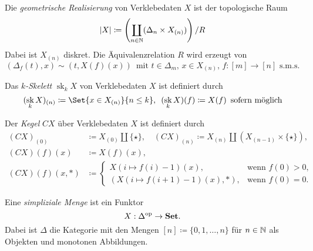 \documentclass{cheat-sheet}
\DeclareMathOperator{\sk}{sk} %
\begin{document}
\begin{defn}
  Die \emph{geometrische Realisierung} von Verklebedaten $X$ ist der topologische Raum
  \[ \lvert X\rvert \coloneqq \left( \coprod_{n \in \mathbb{N}} (\Delta_n \times X_{(n)}) \right) / R \]
  Dabei ist $X_{(n)}$ diskret. Die Äquivalenzrelation $R$ wird erzeugt von
  \[
    (\Delta_f(t), x) \sim (t, X(f)(x)) \enspace
    \text{mit $t \in \Delta_m$, $x \in X_{(n)}$, $f : [m] {\to} [n]$ s.m.s.}
  \]
\end{defn}


\begin{defn}
  Das \emph{$k$-Skelett} $\sk_k X$ von Verklebedaten $X$ ist definiert durch
  \[
    (\sk_k X)_{(n)} \coloneqq
    \Set{ x \in X_{(n)} }{ n \leq k }, \enspace
    (\sk_k X)(f) \coloneqq X(f) \enspace \text{sofern möglich}
  \]
\end{defn}

\begin{defn}
  Der \emph{Kegel} $CX$ über Verklebedaten $X$ ist definiert durch
  \begin{align*}
    (CX)_{(0)} & \coloneqq X_{(0)} \amalg \{ \star \}, \quad (CX)_{(n)} \coloneqq X_{(n)} \amalg (X_{(n-1)} \times \{ \star \}), \\
    (CX)(f)(x) & \coloneqq X(f)(x), \\
    (CX)(f)(x,*) &  \coloneqq \begin{cases}
      X(i \mapsto f(i) - 1)(x), & \text{wenn $f(0) > 0$,} \\
      (X(i \mapsto f(i{+}1) - 1)(x), *), & \text{wenn $f(0) = 0$.}
    \end{cases}
  \end{align*}
\end{defn}



\begin{defn}
  Eine \emph{simpliziale Menge} ist ein Funktor
  \[ X : \Delta^{\mathrm{op}} \to \mathbf{Set}. \]
  Dabei ist $\Delta$ die Kategorie mit den Mengen
  $[n] \coloneqq \{ 0, 1, \ldots, n \}$ für $n \in \mathbb{N}$ als Objekten und monotonen Abbildungen.
\end{defn}
\end{document}
